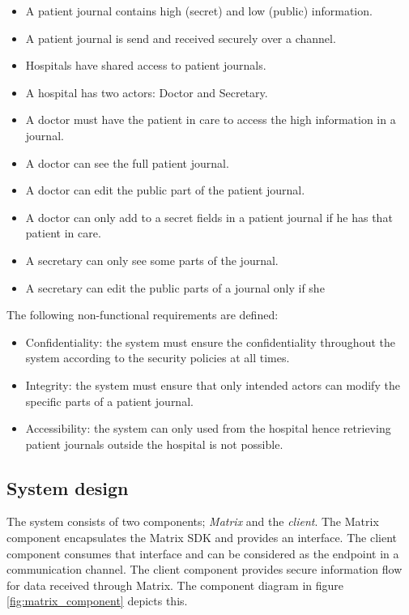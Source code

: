 \begin{itemize}
	\item A patient journal contains high (secret) and low (public) information.
	\item A patient journal is send and received securely over a channel.
	\item Hospitals have shared access to patient journals. 
	\item A hospital has two actors: Doctor and Secretary.
	\item A doctor must have the patient in care to access the high information in a journal.
	\item A doctor can see the full patient journal.
	\item A doctor can edit the public part of the patient journal.
	\item A doctor can only add to a secret fields in a patient journal if he has that patient in care.
	\item A secretary can only see some parts of the journal.
	\item A secretary can edit the public parts of a journal only if she 
\end{itemize}

The following non-functional requirements are defined:

\begin{itemize}
	\item Confidentiality: the system must ensure the confidentiality throughout the system according to the security policies at all times.
	\item Integrity: the system must ensure that only intended actors can modify the specific parts of a patient journal.
	\item Accessibility: the system can only used from the hospital hence retrieving patient journals outside the hospital is not possible.
\end{itemize}


\subsection{System design}


The system consists of two components; \emph{Matrix} and the \emph{client}. The Matrix component encapsulates the Matrix SDK and provides an interface. The client component consumes that interface and can be considered as the endpoint in a communication channel. The client component provides secure information flow for data received through Matrix. 
The component diagram in figure \ref{fig:matrix_component} depicts this.

